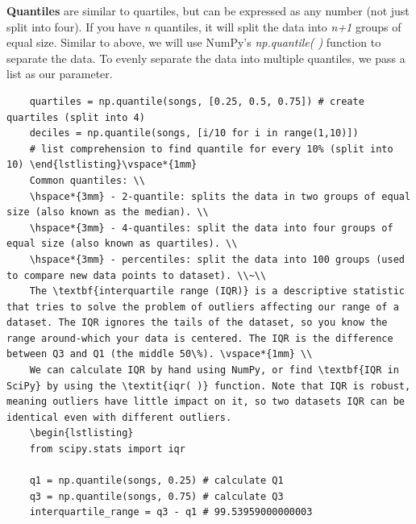 \documentclass[11pt, a4paper]{article}
\begin{document}
\begin{spacing}{1.1}
	\noindent \textbf{Quantiles} are similar to quartiles, but can be expressed as any number (not just split into four). If you have \textit{n} quantiles, it will split the data into \textit{n+1} groups of equal size. Similar to above, we will use NumPy's \textit{np.quantile( )} function to separate the data. To evenly separate the data into multiple quantiles, we pass a list as our parameter. 
	\begin{lstlisting}
	quartiles = np.quantile(songs, [0.25, 0.5, 0.75]) # create quartiles (split into 4)
	deciles = np.quantile(songs, [i/10 for i in range(1,10)]) 
	# list comprehension to find quantile for every 10% (split into 10) \end{lstlisting}\vspace*{1mm}
	Common quantiles: \\
	\hspace*{3mm} - 2-quantile: splits the data in two groups of equal size (also known as the median). \\
	\hspace*{3mm} - 4-quantiles: split the data into four groups of equal size (also known as quartiles). \\
	\hspace*{3mm} - percentiles: split the data into 100 groups (used to compare new data points to dataset). \\~\\
	The \textbf{interquartile range (IQR)} is a descriptive statistic that tries to solve the problem of outliers affecting our range of a dataset. The IQR ignores the tails of the dataset, so you know the range around-which your data is centered. The IQR is the difference between Q3 and Q1 (the middle 50\%). \vspace*{1mm} \\
	We can calculate IQR by hand using NumPy, or find \textbf{IQR in SciPy} by using the \textit{iqr( )} function. Note that IQR is robust, meaning outliers have little impact on it, so two datasets IQR can be identical even with different outliers.
	\begin{lstlisting}
	from scipy.stats import iqr
	
	q1 = np.quantile(songs, 0.25) # calculate Q1
	q3 = np.quantile(songs, 0.75) # calculate Q3
	interquartile_range = q3 - q1 # 99.53959000000003
	

\end{lstlisting}
\end{spacing}
\end{document}
